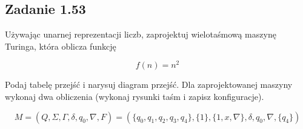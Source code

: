 \documentclass[leqno]{article}
\begin{document}
        \newpage
        \subsection{Zadanie 1.53}
            
            Używając unarnej reprezentacji liczb, zaprojektuj wielotaśmową
            maszynę Turinga, która oblicza funkcję

            \begin{equation}
                f(n) = n^2
            \end{equation}

            Podaj tabelę przejść i narysuj diagram przejść. Dla zaprojektowanej maszyny
            wykonaj dwa obliczenia (wykonaj rysunki taśm i zapisz konfiguracje).

            \begin{equation}
                    M = (Q, \Sigma, \Gamma, \delta, q_0, \nabla, F) = (
                        \{q_0, q_1, q_2, q_3, q_4\}, 
                        \{1\}, 
                        \{1, x, \nabla\}, 
                        \delta, 
                        q_0, 
                        \nabla, 
                        \{q_4\}
                    )
            \end{equation}

            \begin{center}
            \end{center}
\end{document}

